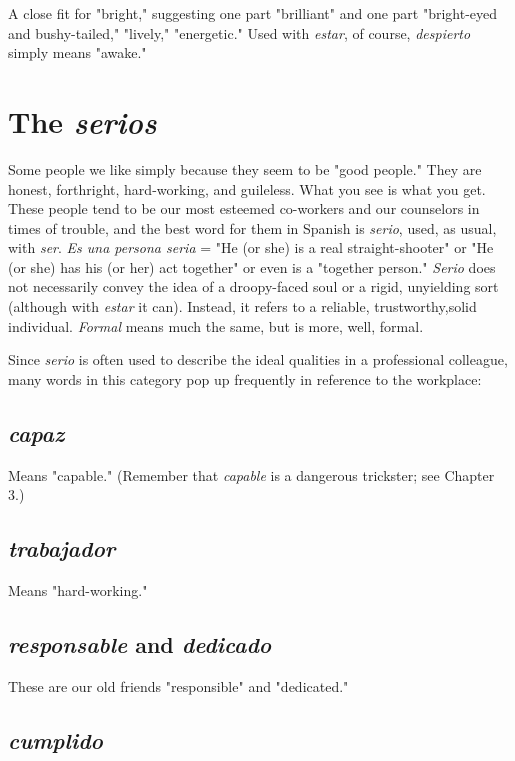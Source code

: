 \documentclass[14pt,a4paper,oneside]{memoir}
\begin{document}
A close fit for "bright," suggesting one part "brilliant" and one part "bright-eyed and bushy-tailed," "lively," "energetic." Used with \emph{estar}, of course, \emph{despierto} simply means "awake."

\section{The \emph{serios}}

Some people we like simply because they seem to be "good
people." They are honest, forthright, hard-working, and guileless. What
you see is what you get. These people tend to be our most esteemed
co-workers and our counselors in times of trouble, and the best word
for them in Spanish is \emph{serio}, used, as usual, with \emph{ser}. \emph{Es una persona
	seria} = "He (or she) is a real straight-shooter" or "He (or she) has his
(or her) act together" or even is a "together person." \emph{Serio} does not
necessarily convey the idea of a droopy-faced soul or a rigid, unyielding
sort (although with \emph{estar} it can). Instead, it refers to a reliable, trustworthy,solid individual. \emph{Formal} means much the same, but is more, well, formal.

Since \emph{serio} is often used to describe the ideal qualities in a
professional colleague, many words in this category pop up frequently
in reference to the workplace:

\subsection{\emph{capaz}}

Means "capable." (Remember that \emph{capable} is a dangerous trickster; see Chapter 3.)

\subsection{\emph{trabajador}}

Means "hard-working."

\subsection{\emph{responsable} and \emph{dedicado}}

These are our old friends "responsible" and "dedicated."

\subsection{\emph{cumplido}}
\end{document}
